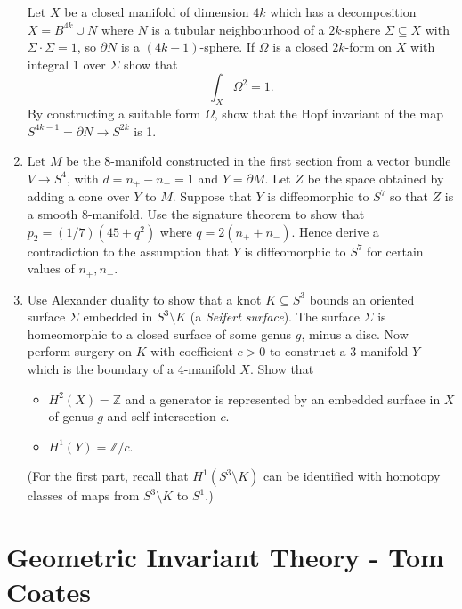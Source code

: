 \documentclass{article}
\theoremstyle{definition}
\newcommand{\Z}{\mathbb{Z}}
\begin{document}
\begin{enumerate}
        Let $X$ be a closed manifold of dimension $4k$ which has a decomposition
        $X=B^{4k}\cup N$ where $N$ is a tubular neighbourhood of a $2k$-sphere
        $\Sigma\subseteq X$ with $\Sigma\cdot\Sigma=1$, so $\partial N$ is a
        $(4k-1)$-sphere. If $\Omega$ is a closed $2k$-form on $X$ with integral
        1 over $\Sigma$ show that
        \begin{equation*}
            \int_X\Omega^2=1.
        \end{equation*}
        By constructing a suitable form $\Omega$, show that the Hopf invariant
        of the map $S^{4k-1}=\partial N\to S^{2k}$ is 1.

    \item Let $M$ be the 8-manifold constructed in the first section from a
        vector bundle $V\to S^4$, with $d=n_+-n_-=1$ and $Y=\partial M$. Let $Z$
        be the space obtained by adding a cone over $Y$ to $M$. Suppose that $Y$
        is diffeomorphic to $S^7$ so that $Z$ is a smooth 8-manifold. Use the
        signature theorem to show that $p_2=(1/7)(45+q^2)$ where $q=2(n_++n_-)$.
        Hence derive a contradiction to the assumption that $Y$ is diffeomorphic
        to $S^7$ for certain values of $n_+,n_-$.

    \item Use Alexander duality to show that a knot $K\subseteq S^3$ bounds an
        oriented surface $\Sigma$ embedded in $S^3\setminus K$ (a \emph{Seifert
        surface}). The surface $\Sigma$ is homeomorphic to a closed surface of
        some genus $g$, minus a disc. Now perform surgery on $K$ with
        coefficient $c>0$ to construct a 3-manifold $Y$ which is the boundary of
        a 4-manifold $X$. Show that
        \begin{itemize}
            \item $H^2(X)=\Z$ and a generator is represented by an embedded
                surface in $X$ of genus $g$ and self-intersection $c$.
            \item $H^1(Y)=\Z/c$.
        \end{itemize}
        (For the first part, recall that $H^1(S^3\setminus K)$ can be identified
        with homotopy classes of maps from $S^3\setminus K$ to $S^1$.)
\end{enumerate}

\section{Geometric Invariant Theory - Tom Coates}
\end{document}

